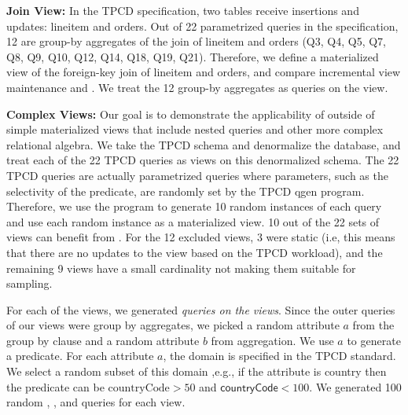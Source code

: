 \textbf{Join View:} In the TPCD specification, two tables receive insertions and updates: \textsf{lineitem} and \textsf{orders}.
Out of 22 parametrized queries in the specification, 12 are group-by aggregates of the join of \textsf{lineitem} and \textsf{orders} (Q3, Q4, Q5, Q7, Q8, Q9, Q10, Q12, Q14, Q18, Q19, Q21).
Therefore, we define a materialized view of the foreign-key join of \textsf{lineitem} and \textsf{orders}, and compare incremental view maintenance and \svc.
We treat the 12 group-by aggregates as queries on the view.


\textbf{Complex Views:} Our goal is to demonstrate the applicability of \svc outside of simple materialized views that include nested queries and other more complex relational algebra.
We take the TPCD schema and denormalize the database, and treat each of the 22 
TPCD queries as views on this denormalized schema. 
The 22 TPCD queries are actually parametrized queries where parameters, such as the selectivity of the predicate, are randomly set by the TPCD \textsf{qgen} program.
Therefore, we use the program to generate 10 random instances of each query and use each random instance as a materialized view.
10 out of the 22 sets of views can benefit from \svc.
For the 12 excluded views, 3 were static (i.e, this means that there are no updates to the view based on the TPCD workload), and the remaining 9 views have a small cardinality not making them suitable for sampling.


For each of the views, we generated \emph{queries on the views}.
Since the outer queries of our views were group by aggregates, we picked a random attribute $a$ from the group by clause and a random attribute $b$ from aggregation.
We use $a$ to generate a predicate.
For each attribute $a$, the domain is specified in the TPCD standard.
We select a random subset of this domain ,e.g., if the attribute is country then the predicate can be $\text{countryCode} > 50$ and $\textsf{countryCode} < 100$.
We generated 100 random \sumfunc, \avgfunc, and \countfunc queries for each view.

